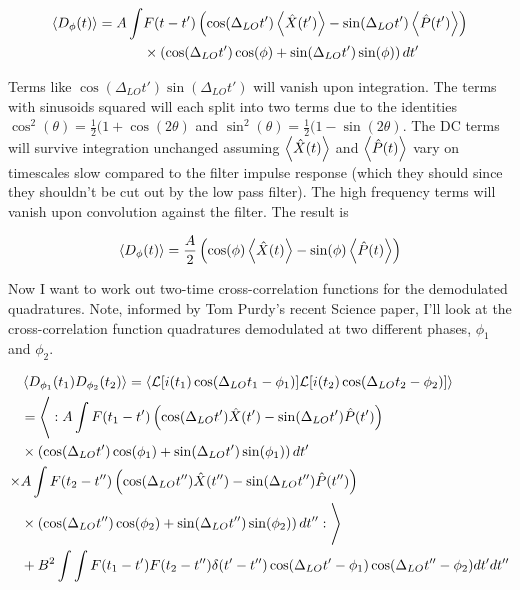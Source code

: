 \documentclass[12pt]{article}
\begin{document}
\begin{align}
\Braket{D_{\phi}(t)} = A\int& F(t-t') \left(\cos(\Delta_{LO}t')\Braket{\hat{X}(t')} - \sin(\Delta_{LO}t')\Braket{\hat{P}(t')}\right)\\
&\times\left(\cos(\Delta_{LO}t')\cos(\phi) + \sin(\Delta_{LO}t')\sin(\phi)\right) dt'
\end{align}

Terms like $\cos(\Delta_{LO}t')\sin(\Delta_{LO}t')$ will vanish upon integration. The terms with sinusoids squared will each split into two terms due to the identities $\cos^2(\theta) = \frac{1}{2}(1+\cos(2\theta)$ and $\sin^2(\theta) = \frac{1}{2}(1-\sin(2\theta)$. The DC terms will survive integration unchanged assuming $\Braket{\hat{X}(t)}$ and $\Braket{\hat{P}(t)}$ vary on timescales slow compared to the filter impulse response (which they should since they shouldn't be cut out by the low pass filter). The high frequency terms will vanish upon convolution against the filter. The result is

\begin{align}
\Braket{D_{\phi}(t)} = \frac{A}{2}\left(\cos(\phi)\Braket{\hat{X}(t)} - \sin(\phi)\Braket{\hat{P}(t)}\right)
\end{align}

Now I want to work out two-time cross-correlation functions for the demodulated quadratures. Note, informed by Tom Purdy's recent Science paper, I'll look at the cross-correlation function quadratures demodulated at two different phases, $\phi_1$ and $\phi_2$.

\begin{align}
&\Braket{D_{\phi_1}(t_1)D_{\phi_2}(t_2)} = \langle\mathcal{L}[i(t_1)\cos(\Delta_{LO}t_1-\phi_1)]\mathcal{L}[i(t_2)\cos(\Delta_{LO}t_2-\phi_2)]\rangle\\
&=\Bigg<: A\int F(t_1-t') \left(\cos(\Delta_{LO}t')\hat{X}(t') - \sin(\Delta_{LO}t')\hat{P}(t')\right)\\
&\times\left(\cos(\Delta_{LO}t')\cos(\phi_1) + \sin(\Delta_{LO}t')\sin(\phi_1)\right) dt'\\
\times& A\int F(t_2-t'') \left(\cos(\Delta_{LO}t'')\hat{X}(t'') - \sin(\Delta_{LO}t'')\hat{P}(t'')\right)\\
&\times\left(\cos(\Delta_{LO}t'')\cos(\phi_2) + \sin(\Delta_{LO}t'')\sin(\phi_2)\right) dt'':\Bigg>\\
&+B^2\int\int F(t_1-t')F(t_2-t'') \delta(t'-t'') \cos(\Delta_{LO}t'-\phi_1)\cos(\Delta_{LO}t''-\phi_2)dt'dt''
\end{align}
\end{document}

